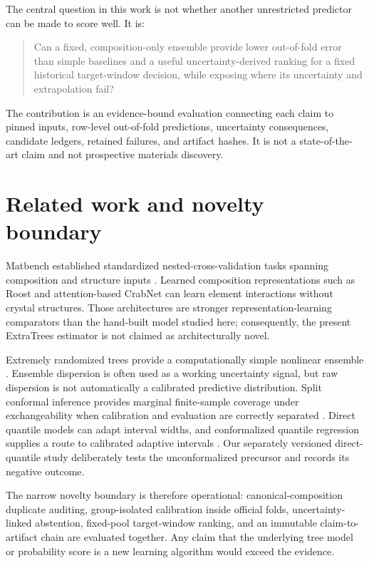 \documentclass[11pt]{article}
\begin{document}
The central question in this work is not whether another unrestricted predictor can be made to score well. It is:
\begin{quote}
Can a fixed, composition-only ensemble provide lower out-of-fold error than simple baselines and a useful uncertainty-derived ranking for a fixed historical target-window decision, while exposing where its uncertainty and extrapolation fail?
\end{quote}
The contribution is an evidence-bound evaluation connecting each claim to pinned inputs, row-level out-of-fold predictions, uncertainty consequences, candidate ledgers, retained failures, and artifact hashes. It is not a state-of-the-art claim and not prospective materials discovery.

\section{Related work and novelty boundary}
Matbench established standardized nested-cross-validation tasks spanning composition and structure inputs \cite{dunn2020matbench}. Learned composition representations such as Roost \cite{goodall2020roost} and attention-based CrabNet \cite{wang2021crabnet} can learn element interactions without crystal structures. Those architectures are stronger representation-learning comparators than the hand-built model studied here; consequently, the present ExtraTrees estimator is not claimed as architecturally novel.

Extremely randomized trees provide a computationally simple nonlinear ensemble \cite{geurts2006extratrees}. Ensemble dispersion is often used as a working uncertainty signal, but raw dispersion is not automatically a calibrated predictive distribution. Split conformal inference provides marginal finite-sample coverage under exchangeability when calibration and evaluation are correctly separated \cite{lei2018conformal}. Direct quantile models can adapt interval widths, and conformalized quantile regression supplies a route to calibrated adaptive intervals \cite{romano2019cqr}. Our separately versioned direct-quantile study deliberately tests the unconformalized precursor and records its negative outcome.

The narrow novelty boundary is therefore operational: canonical-composition duplicate auditing, group-isolated calibration inside official folds, uncertainty-linked abstention, fixed-pool target-window ranking, and an immutable claim-to-artifact chain are evaluated together. Any claim that the underlying tree model or probability score is a new learning algorithm would exceed the evidence.
\end{document}
